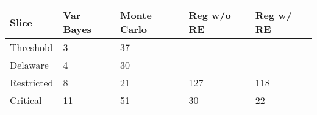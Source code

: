 \begin{tabular}{lllll}
  \hline
Slice & Var Bayes & Monte Carlo & Reg w/o RE & Reg w/ RE \\ 
  \hline
  Threshold & 3 & 37 & ~ & ~ \\ 
  Delaware & 4 & 30 & ~ & ~ \\ 
  Restricted & 8 & 21 & 127 & 118 \\ 
  Critical & 11 & 51 & 30 & 22 \\ 
  \hline
\end{tabular}
